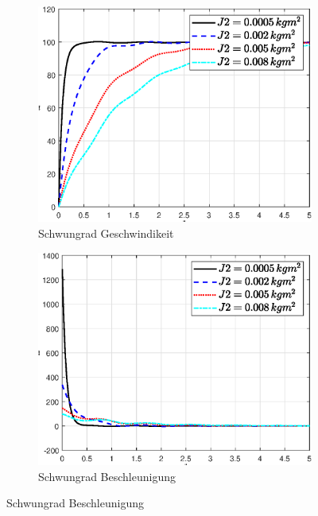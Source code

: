 \begin{figure}
    \captionsetup[subfigure]{justification=centering,font=footnotesize}
    \begin{subfigure}[b]{0.49\linewidth}
        \includegraphics[width=\linewidth]{plot_data/parameter/fig/j2/phi_punkt.eps}
        \caption{Schwungrad Geschwindikeit}
        \label{fig:j2_phi_punkt}
    \end{subfigure}
    \begin{subfigure}[b]{0.49 \linewidth}
        \includegraphics[width=\linewidth]{plot_data/parameter/fig/j2/phi_punkt_punkt.eps}
        \caption{Schwungrad Beschleunigung}

\end{subfigure}
\end{figure}
